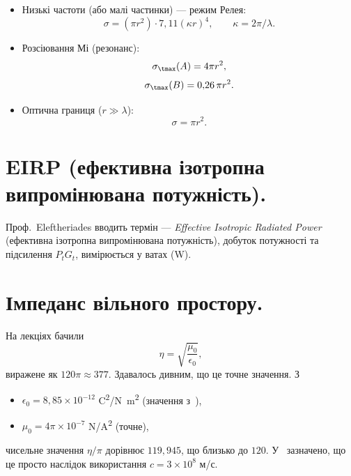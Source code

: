 \begin{itemize}
\item Низькі частоти (або малі частинки) — режим Релея:
\begin{equation}\label{eqn:chapter2Notes:1040}
\sigma = (\pi r^2) \cdot 7{,}11 (\kappa r)^4, \qquad \kappa = 2 \pi/\lambda.
\end{equation}

\item Розсіювання Мі (резонанс):
\begin{equation}\label{eqn:chapter2Notes:1060}
\sigma_\tmax(A) = 4 \pi r^2,
\end{equation}
\begin{equation}\label{eqn:chapter2Notes:1080}
\sigma_\tmax(B) = 0{,}26\, \pi r^2.
\end{equation}

\item Оптична границя (\(r \gg \lambda\)):
\begin{equation}\label{eqn:chapter2Notes:1100}
\sigma = \pi r^2.
\end{equation}
\end{itemize}


\section{EIRP (ефективна ізотропна випромінювана потужність).}
Проф.~Eleftheriades вводить термін  — \emph{Effective Isotropic Radiated Power} (ефективна ізотропна випромінювана потужність), добуток потужності та підсилення \(P_t G_t\), вимірюється у ватах (\si{W}).

\section{Імпеданс вільного простору.}
На лекціях бачили
\begin{equation}\label{eqn:chapter2Notes:111}
\eta = \sqrt{\frac{\mu_0}{\epsilon_0}},
\end{equation}
виражене як \(120 \pi \approx 377\). Здавалось дивним, що це точне значення. З
\begin{itemize}
\item \(\epsilon_0 = 8{,}85 \times 10^{-12}\) \si{C^2/N m^2} (значення з~\citep{griffiths1999introduction}),
\item \(\mu_0 = 4 \pi \times 10^{-7}\) \si{N/A^2} (точне),
\end{itemize}
чисельне значення \(\eta/\pi\) дорівнює \(119{,}945\), що близько до \(120\). У~\citep{wiki:freespaceImpedance} зазначено, що це просто наслідок використання \(c = 3 \times 10^8\) \si{м/с}.

